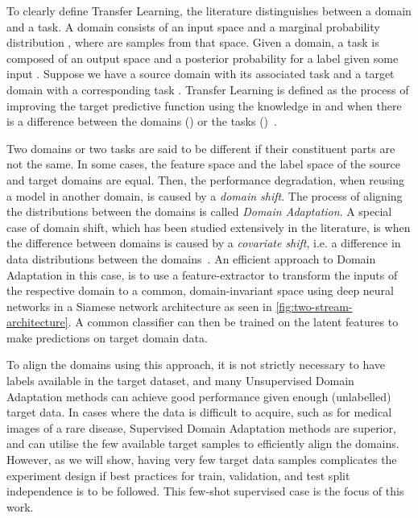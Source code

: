 \documentclass[journal]{IEEEtran}
\begin{document}
To clearly define Transfer Learning, the literature distinguishes between a domain and a task. A domain  consists of an input space  and a marginal probability distribution , where  are  samples from that space. Given a domain, a task  is composed of an output space  and a posterior probability  for a label  given some input . 
Suppose we have a source domain  with its associated task  and a target domain  with a corresponding task . Transfer Learning is defined as the  process of improving the target predictive function  using the knowledge in   and  when there is a difference between the domains () or the tasks ()~\cite{pan2010survey}. 

Two domains or two tasks are said to be different if their constituent parts are not the same. 
In some cases, the feature space and the label space of the source and target domains are equal. Then, the performance degradation, when reusing a model in another domain, is caused by a \textit{domain shift}. The process of aligning the distributions between the domains is called \textit{Domain Adaptation}. A special case of domain shift, which has been studied extensively in the literature, is when the difference between domains is caused by a \textit{covariate shift}, i.e. a difference in data distributions between the domains~\cite{kouw2018introduction}.
An efficient approach to Domain Adaptation in this case, is to use a feature-extractor  to transform the inputs of the respective domain to a common, domain-invariant space using deep neural networks in a Siamese network architecture as seen in \cref{fig:two-stream-architecture}. A common classifier  can then be trained on the latent features to make predictions on target domain data.



To align the domains using this approach, it is not strictly necessary to have labels available in the target dataset, and many Unsupervised Domain Adaptation methods can achieve good performance given enough (unlabelled) target data. In cases where the data is difficult to acquire, such as for medical images of a rare disease, Supervised Domain Adaptation methods are superior, and can utilise the few available target samples to efficiently align the domains. 
However, as we will show, having very few target data samples complicates the experiment design if best practices for train, validation, and test split independence is to be followed.
This few-shot supervised case is the focus of this work.
\end{document}
